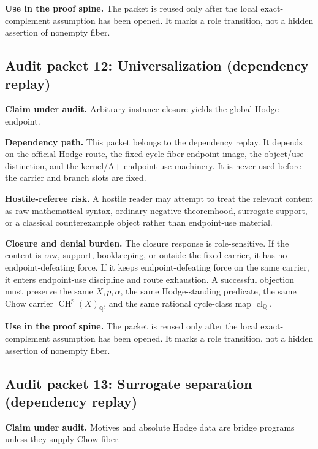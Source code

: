 \documentclass[11pt]{article}
\newcommand{\QQ}{\mathbb{Q}}
\newcommand{\CH}{\operatorname{CH}}
\newcommand{\clQ}{\operatorname{cl}_{\QQ}}
\begin{document}
\par\noindent\textbf{Use in the proof spine.} The packet is reused only after the local exact-complement assumption has been opened. It marks a role transition, not a hidden assertion of nonempty fiber.


\subsection{Audit packet 12: Universalization (dependency replay)}


\par\noindent\textbf{Claim under audit.} Arbitrary instance closure yields the global Hodge endpoint.


\par\noindent\textbf{Dependency path.} This packet belongs to the dependency replay. It depends on the official Hodge route, the fixed cycle-fiber endpoint image, the object/use distinction, and the kernel/A+ endpoint-use machinery. It is never used before the carrier and branch slots are fixed.


\par\noindent\textbf{Hostile-referee risk.} A hostile reader may attempt to treat the relevant content as raw mathematical syntax, ordinary negative theoremhood, surrogate support, or a classical counterexample object rather than endpoint-use material.


\par\noindent\textbf{Closure and denial burden.} The closure response is role-sensitive. If the content is raw, support, bookkeeping, or outside the fixed carrier, it has no endpoint-defeating force. If it keeps endpoint-defeating force on the same carrier, it enters endpoint-use discipline and route exhaustion. A successful objection must preserve the same $X,p,\alpha$, the same Hodge-standing predicate, the same Chow carrier $\CH^p(X)_\QQ$, and the same rational cycle-class map $\clQ$.


\par\noindent\textbf{Use in the proof spine.} The packet is reused only after the local exact-complement assumption has been opened. It marks a role transition, not a hidden assertion of nonempty fiber.


\subsection{Audit packet 13: Surrogate separation (dependency replay)}


\par\noindent\textbf{Claim under audit.} Motives and absolute Hodge data are bridge programs unless they supply Chow fiber.
\end{document}
